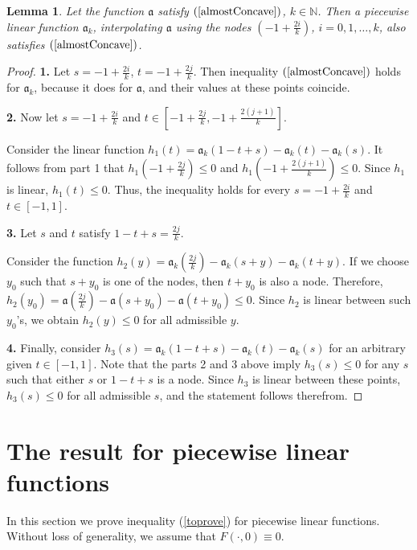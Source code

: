 \documentclass[12pt]{article}
\newcommand{\Nat}{\mathbb N}
\renewcommand{\le}{\leqslant}
\newtheorem{lm}{Lemma}
\begin{document}
\begin{lm}
\label{piecewiseLinearConcave}
Let the function $\mathfrak a$ satisfy $(\ref{almostConcave})$, $k \in \Nat$.
Then a piecewise linear function $\mathfrak a_k$,
interpolating $\mathfrak a$ using the nodes
$(-1 + \frac{2i}{k})$, $i = 0, 1, \dots, k$,
also satisfies $(\ref{almostConcave})$.
\end{lm}
\begin{proof}
{\bf 1.}
Let $s = -1 + \frac{2i}{k}$, $t = -1 + \frac{2j}{k}$.
Then inequality $(\ref{almostConcave})$ holds for $\mathfrak a_k$, because it does for $\mathfrak a$,
and their values at these points coincide.

{\bf 2.}
Now let $s = -1 + \frac{2i}{k}$ and $t \in [-1 + \frac{2j}{k}, -1 + \frac{2(j + 1)}{k}]$.

Consider the linear function $h_1(t) = \mathfrak a_k( 1 - t + s ) - \mathfrak a_k(t) - \mathfrak a_k(s)$.
It follows from part 1 that $h_1(-1 + \frac{2j}{k}) \le 0$ and $h_1(-1 + \frac{2(j + 1)}{k}) \le 0$.
Since $h_1$ is linear, $h_1(t) \le 0$.
Thus, the inequality holds for every $s = -1 + \frac{2i}{k}$ and $t \in [-1, 1]$.

{\bf 3.}
Let $s$ and $t$ satisfy $1 - t + s = \frac{2j}{k}$.

Consider the function $h_2(y) = \mathfrak a_k(\frac{2j}{k}) - \mathfrak a_k(s + y) - \mathfrak a_k(t + y)$.
If we choose $y_0$ such that $s + y_0$ is one of the nodes, then $t + y_0$ is also a node.
Therefore, $h_2(y_0) = \mathfrak a(\frac{2j}{k}) - \mathfrak a(s + y_0) - \mathfrak a(t + y_0) \le 0$.
Since $h_2$ is linear between such $y_0$'s, we obtain $h_2(y) \le 0$ for all admissible $y$.

{\bf 4.}
Finally, consider $h_3(s) = \mathfrak a_k( 1 - t + s ) - \mathfrak a_k(t) - \mathfrak a_k(s)$ for an arbitrary given $t \in [-1, 1]$.
Note that the parts 2 and 3 above imply $h_3(s) \le 0$ for any $s$
such that either $s$ or $1 - t + s$ is a node.
Since $h_3$ is linear between these points, $h_3(s) \le 0$ for all admissible $s$,
and the statement follows therefrom.
\end{proof}


\section{The result for piecewise linear functions}

\rm
In this section we prove inequality (\ref{toprove}) for piecewise linear functions.
Without loss of generality, we assume that $F(\cdot, 0) \equiv 0$.
\end{document}
